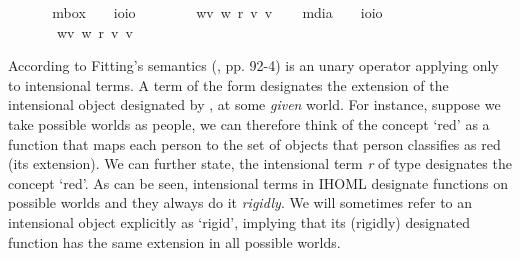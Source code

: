 \begin{isabellebody}
\isanewline
\ \ \isanewline
\ \ \isamarkupfalse%
\ mbox\ \ \ {\isacharcolon}{\isacharcolon}\ {\isachardoublequoteopen}io{\isasymRightarrow}io{\isachardoublequoteclose}\ {\isacharparenleft}{\isachardoublequoteopen}\isanewline
\ \ \ \ \ {\isachardoublequoteopen}\isactrlbold {\isasymbox}{\isasymphi}\ {\isasymequiv}\ {\isasymlambda}w{\isachardot}{\isasymforall}v{\isachardot}\ {\isacharparenleft}w\ r\ v{\isacharparenright}{\isasymlongrightarrow}{\isacharparenleft}{\isasymphi}\ v{\isacharparenright}{\isachardoublequoteclose}\isanewline
\ \ \isamarkupfalse%
\ mdia\ \ \ {\isacharcolon}{\isacharcolon}\ {\isachardoublequoteopen}io{\isasymRightarrow}io{\isachardoublequoteclose}\ {\isacharparenleft}{\isachardoublequoteopen}\isanewline
\ \ \ \ \ {\isachardoublequoteopen}\isactrlbold {\isasymdiamond}{\isasymphi}\ {\isasymequiv}\ {\isasymlambda}w{\isachardot}{\isasymexists}v{\isachardot}\ {\isacharparenleft}w\ r\ v{\isacharparenright}{\isasymand}{\isacharparenleft}{\isasymphi}\ v{\isacharparenright}{\isachardoublequoteclose}%
\isamarkuptrue%
%
\begin{isamarkuptext}%
According to Fitting's semantics (\cite{Fitting}, pp. 92-4) \isa{{\isasymdown}} is an unary operator applying only to 
 intensional terms. A term of the form \isa{{\isasymdown}{\isasymalpha}} designates the extension of the intensional object designated by 
 \isa{{\isasymalpha}}, at some \emph{given} world. For instance, suppose we take possible worlds as people,
 we can therefore think of the concept `red' as a function that maps each person to the set of objects that person
 classifies as red (its extension). We can further state, the intensional term \emph{r} of type \isa{{\isasymup}{\isasymlangle}{\isasymzero}{\isasymrangle}} designates the concept `red'.
 As can be seen, intensional terms in IHOML designate functions on possible worlds and they always do it \emph{rigidly}. 
 We will sometimes refer to an intensional object explicitly as `rigid', implying that its (rigidly) designated function has
 the same extension in all possible worlds.%

\end{isamarkuptext}
\end{isabellebody}
